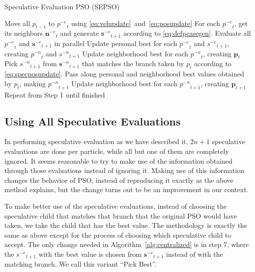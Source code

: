 \documentclass{llncs}
\newcommand{\alg}[1]{Algorithm~\ref{alg:#1}}
\providecommand{\noeval}[1]{\ensuremath{#1^{-e}}}
\providecommand{\nonbest}[1]{\ensuremath{#1^{-n}}}
\providecommand{\p}{\ensuremath{p}}
\providecommand{\pset}{\ensuremath{\mathbf{p}}}
\providecommand{\s}{\ensuremath{s}}
\providecommand{\sset}{\ensuremath{\mathbf{s}}}
\providecommand{\nset}{\ensuremath{\mathbf{n}}}
\begin{document}
\begin{algorithm}
  \caption{Speculative Evaluation PSO (SEPSO)}
  \label{alg:centralized}
  \begin{algorithmic}[1]
	\STATE Move all $\p_{t-1}$ to $\noeval{\p}_t$ using
	  \eqref{eq:velupdate}~and~\eqref{eq:posupdate}
	\STATE For each $\noeval{\p}_t$, get its neighbors $\noeval{\nset}_t$ and
	  generate $\noeval{\sset}_{t+1}$ according to
	  \eqref{eq:defpcasegen}.
	\STATE Evaluate all $\noeval{\p}_t$ and $\noeval{\sset}_{t+1}$ in parallel
	\STATE Update personal best for each $\noeval{\p}_t$ and
	  $\noeval{\s}_{t+1}$, creating $\nonbest{\p}_t$ and $\nonbest{\s}_{t+1}$
	\STATE Update neighborhood best for each $\nonbest{\p}_t$, creating
	  $\pset_t$
	\FORALL{$\p_t$}
	\STATE Pick $\nonbest{\s}_{t+1}$ from $\nonbest{\sset}_{t+1}$ that matches
	  the branch taken by $\p_t$ according to
	  \eqref{eq:specposupdate}.
	\STATE Pass along personal and neighborhood best values obtained by $\p_t$,
	  making $\nonbest{\p}_{t+1}$
	\ENDFOR
	\STATE Update neighborhood best for each $\nonbest{\p}_{t+1}$, creating
	  $\pset_{t+1}$
	\STATE Repeat from Step 1 until finished
  \end{algorithmic}
\end{algorithm}

\subsection{Using All Speculative Evaluations}
\label{sec:extra}

In performing speculative evaluation as we have described it, $2n+1$
speculative evaluations are done per particle, while all but one of them are
completely ignored.  It seems reasonable to try to make use of the information
obtained through those evaluations instead of ignoring it.  Making use of this
information changes the behavior of PSO, instead of reproducing it exactly as
the above method explains, but the change turns out to be an improvement in our
context.

To make better use of the speculative evaluations, instead of choosing the
speculative child that matches that branch that the original PSO would have
taken, we take the child that has the best value.  The methodology is exactly
the same as above except for the process of choosing which speculative child to
accept.  The only change needed in \alg{centralized} is in step 7, where the
$\noeval{\s}_{t+1}$ with the best value is chosen from $\noeval{\sset}_{t+1}$
instead of with the matching branch. We call this variant ``Pick Best''.
\end{document}
